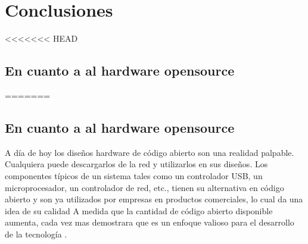  \chapter{Conclusiones}

<<<<<<< HEAD
	\section{En cuanto a al hardware opensource}
	 

=======
	\section{En cuanto a al hardware opensource} 
A día de hoy los diseños hardware de código abierto son una realidad palpable. Cualquiera puede descargarlos de la red y utilizarlos en sus diseños. Los componentes típicos de un sistema tales como un controlador USB, un microprocesador, un controlador de red, etc., tienen su alternativa en código abierto y son ya utilizados por empresas en productos comerciales, lo cual da una idea de su calidad
A medida que la cantidad de código abierto disponible aumenta, cada vez mas demostrara que es un enfoque valioso para el desarrollo de la tecnología .

